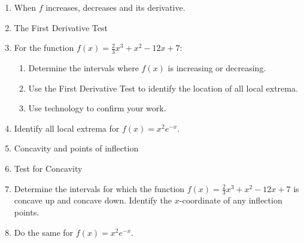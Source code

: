 \documentclass[11pt,fleqn]{article}
\begin{document}
\setlength{\parindent}{0cm}
\renewcommand{\headrulewidth}{0pt}
\newcommand{\blank}[1]{\rule{#1}{0.75pt}}
\renewcommand{\d}{\displaystyle}
\vspace*{-0.7in}
\begin{center}
 {\large{ }}
\end{center}
 \begin{enumerate}
 \item When $f$ increases, decreases and its derivative.
 \vspace{2in}
 \item The First Derivative Test
 \vspace{1in}
 \item For the function $f(x)=\frac{2}{3}x^3+x^2-12x+7$: 
 \begin{enumerate}
 	\item Determine the intervals where $f(x)$ is increasing or decreasing.
	\item Use the First Derivative Test to identify the location of all local extrema.
	\item Use technology to confirm your work.
\end{enumerate}
\vfill
\newpage
\item Identify all local extrema for $f(x)=x^2e^{-x}.$
\vspace{1.5in}
\item Concavity and points of inflection
\vspace{2in}
\item Test for Concavity
\vspace{1in}
\item Determine the intervals for which the function $f(x)=\frac{2}{3}x^3+x^2-12x+7$ is concave up and concave down. Identify the $x$-coordinate of any inflection points.
\vfill
\item Do the same for $f(x)=x^2e^{-x}.$
\vfill
 
 \end{enumerate}
\end{document}
